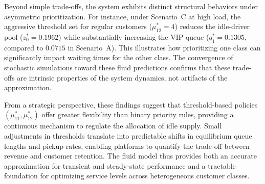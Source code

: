 Beyond simple trade-offs, the system exhibits distinct structural behaviors under asymmetric prioritization.
For instance, under Scenario~C at high load, the aggressive threshold set for regular customers ($\mu_{12}^*=4$) reduces the idle-driver pool ($z_0^*=0.1962$) while substantially increasing the VIP queue ($q_1^*=0.1305$, compared to $0.0715$ in Scenario~A).
This illustrates how prioritizing one class can significantly impact waiting times for the other class.
The convergence of stochastic simulations toward these fluid predictions confirms that these trade-offs are intrinsic properties of the system dynamics, not artifacts of the approximation.

From a strategic perspective, these findings suggest that threshold-based policies $(\mu_{11}^*,\mu_{12}^*)$ offer greater flexibility than binary priority rules, providing a continuous mechanism to regulate the allocation of idle supply.
Small adjustments in thresholds translate into predictable shifts in equilibrium queue lengths and pickup rates, enabling platforms to quantify the trade-off between revenue and customer retention.
The fluid model thus provides both an accurate approximation for transient and steady-state performance and a tractable foundation for optimizing service levels across heterogeneous customer classes.



